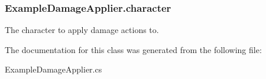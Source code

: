 \subsubsection[{character}]{ Example\+Damage\+Applier.\+character}\label{class_example_damage_applier_a1275e973ce691cf54b0f3e5c1fa90007}


The character to apply damage actions to. 



The documentation for this class was generated from the following file\+:\begin{DoxyCompactItemize}
\item 
Example\+Damage\+Applier.\+cs\end{DoxyCompactItemize}
